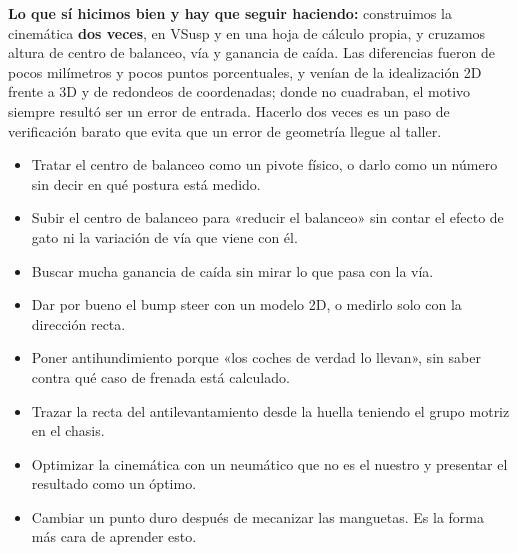 \begin{caso}
\medskip
\textbf{Lo que sí hicimos bien y hay que seguir haciendo:} construimos la
cinemática \textbf{dos veces}, en VSusp y en una hoja de cálculo propia, y
cruzamos altura de centro de balanceo, vía y ganancia de caída. Las diferencias
fueron de pocos milímetros y pocos puntos porcentuales, y venían de la
idealización 2D frente a 3D y de redondeos de coordenadas; donde no cuadraban,
el motivo siempre resultó ser un error de entrada. Hacerlo dos veces es un paso
de verificación barato que evita que un error de geometría llegue al taller.

\medskip
{}
\end{caso}

\begin{ojo}
\begin{itemize}
  \item Tratar el centro de balanceo como un pivote físico, o darlo como un
        número sin decir en qué postura está medido.
  \item Subir el centro de balanceo para «reducir el balanceo» sin contar el
        efecto de gato ni la variación de vía que viene con él.
  \item Buscar mucha ganancia de caída sin mirar lo que pasa con la vía.
  \item Dar por bueno el bump steer con un modelo 2D, o medirlo solo con la
        dirección recta.
  \item Poner antihundimiento porque «los coches de verdad lo llevan», sin
        saber contra qué caso de frenada está calculado.
  \item Trazar la recta del antilevantamiento desde la huella teniendo el
        grupo motriz en el chasis.
  \item Optimizar la cinemática con un neumático que no es el nuestro y
        presentar el resultado como un óptimo.
  \item Cambiar un punto duro después de mecanizar las manguetas. Es la forma
        más cara de aprender esto.
\end{itemize}
\end{ojo}

